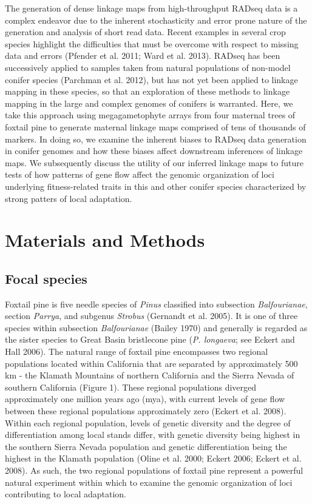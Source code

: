 \documentclass[11pt]{article}
\begin{document}
The generation of dense linkage maps from high-throughput RADseq data is a complex endeavor due to the inherent stochasticity
and error prone nature of the generation and analysis of short read data. Recent examples in several crop species highlight the
difficulties that must be overcome with respect to missing data and errors (Pfender et al. 2011; Ward et al. 2013). RADseq has been 
successively applied to samples taken from natural populations of non-model conifer species (Parchman et al. 2012), but has not yet 
been applied to linkage mapping in these species, so that an exploration of these methods to linkage mapping in the large and complex 
genomes of conifers is warranted. Here, we take this approach using megagametophyte arrays from four maternal trees of foxtail pine
to generate maternal linkage maps comprised of tens of thousands of markers. In doing so, we examine the inherent biases
to RADseq data generation in conifer genomes and how these biases affect downstream inferences of linkage maps. We subsequently discuss
the utility of our inferred linkage maps to future tests of how patterns of gene flow affect the genomic organization 
of loci underlying fitness-related traits in this and other conifer species characterized by strong patters of local adaptation.


\section*{Materials and Methods}

\subsection*{Focal species}
Foxtail pine is five needle species of \textit{Pinus} classified into 
subsection \textit{Balfourianae}, section \textit{Parrya}, and subgenus \textit{Strobus} 
(Gernandt et al. 2005). It is one of three species within subsection \textit{Balfourianae} 
(Bailey 1970) and generally is regarded as the sister species to Great Basin bristlecone pine (\textit{P. longaeva}; see 
Eckert and Hall 2006). The natural range of foxtail pine encompasses two 
regional populations located within California that are separated by approximately 500 km - 
the Klamath Mountains of northern California and the Sierra Nevada of southern California 
(Figure 1). These regional populations diverged approximately one million years ago (mya), 
with current levels of gene flow between these regional populations approximately zero 
(Eckert et al. 2008). Within each regional population, levels of genetic diversity and the 
degree of differentiation among local stands differ, with genetic diversity being highest in 
the southern Sierra Nevada population and genetic differentiation being the highest in the 
Klamath population (Oline et al. 2000; Eckert 2006; Eckert et al. 2008). As such, the two regional 
populations of foxtail pine represent a powerful natural experiment within which to examine
the genomic organization of loci contributing to local adaptation.
\end{document}
